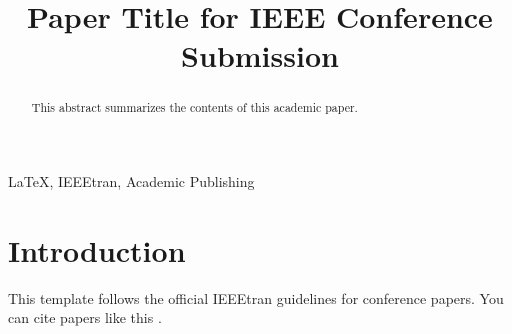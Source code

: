 \documentclass[conference]{IEEEtran}
\begin{document}
\title{Paper Title for IEEE Conference Submission}

\author{
}

\maketitle

\begin{abstract}
This abstract summarizes the contents of this academic paper.
\end{abstract}

\begin{IEEEkeywords}
LaTeX, IEEEtran, Academic Publishing
\end{IEEEkeywords}

\section{Introduction}
This template follows the official IEEEtran guidelines for conference papers. You can cite papers like this \cite{example_ref}.



\end{document}
